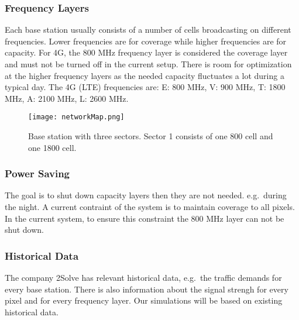 \subsubsection{Frequency Layers}
Each base station usually consists of a number of cells broadcasting
on different frequencies. Lower frequencies are for coverage while
higher frequencies are for capacity. For 4G, the 800 MHz frequency
layer is considered the coverage layer and must not be turned off in
the current setup. There is room for optimization at the higher
frequency layers as the needed capacity fluctuates a lot during a
typical day.  The 4G (LTE) frequencies are:
  E: 800 MHz,
  V: 900 MHz,
  T: 1800 MHz,
  A: 2100 MHz,
  L: 2600 MHz. 

  \begin{figure}[t]
    \centering
    \texttt{[image: networkMap.png]}
    \caption{Base station with three sectors. Sector 1 consists of one 800 cell and one 1800 cell.}
    \label{fig:networkmap}
  \end{figure}

  
\subsubsection{Power Saving}

The goal is to shut down capacity layers then they are not
needed. e.g.\ during the night. A current contraint of the system is
to maintain coverage to all pixels. In the current system, to ensure this constraint the 800
MHz layer can not be shut down.



\subsubsection{Historical Data}

The company 2Solve has relevant historical data, e.g.\ the traffic
demands for every base station. There is also information about the
signal strengh for every pixel and for every frequency layer. Our
simulations will be based on existing historical data.


